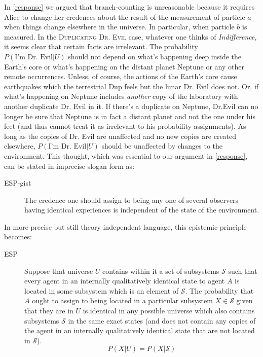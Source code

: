 \documentclass[onecolumn,secnumarabic,amsmath,amssymb,balancelastpage,nofootinbib]{article}
\begin{document}
In \textsection \ref{response} we argued that branch-counting is unreasonable because it requires Alice to change her credences about the result of the measurement of particle $a$ when things change elsewhere in the universe. In particular, when particle $b$ is measured.  In the \textsc{Duplicating Dr. Evil} case, whatever one thinks of \emph{Indifference}, it seems clear that certain facts are irrelevant. The probability $P(\text{I'm Dr. Evil}|U)$ should not depend on what's happening deep inside the Earth's core or what's happening on the distant planet Neptune or any other remote occurrences.  Unless, of course, the actions of the Earth's core cause earthquakes which the terrestrial Dup feels but the lunar Dr. Evil does not.  Or, if what's happening on Neptune includes \emph{another} copy of the laboratory with another duplicate Dr. Evil in it.  If there's a duplicate on Neptune, Dr.Evil can no longer be sure that Neptune is in fact a distant planet and not the one under his feet (and thus cannot treat it as irrelevant to his probability assignments).  As long as the copies of Dr. Evil are unaffected and no new copies are created elsewhere, $P(\text{I'm Dr. Evil}|U)$ should be unaffected by changes to the environment.  This thought, which was essential to our argument in \textsection \ref{response}, can be stated in imprecise slogan form as:
\begin{description}
\item[ESP-gist]  The credence one should assign to being any one of several observers having identical experiences is independent of the state of the environment.
\end{description}
In more precise but still theory-independent language, this epistemic principle becomes:
\begin{description}
\item[ESP]  Suppose that universe $U$ contains within it a set of subsystems $\mathcal{S}$ such that every agent in an internally qualitatively identical state to agent $A$ is located in some subsystem which is an element of $\mathcal{S}$.  The probability that $A$ ought to assign to being located in a particular subsystem $X\in\mathcal{S}$ given that they are in $U$ is identical in any possible universe which also contains subsystems $\mathcal{S}$ in the same exact states (and does not contain any copies of the agent in an internally qualitatively identical state that are not located in $\mathcal{S}$).
\begin{equation}
P(X|U)=P(X|\mathcal{S})
\label{esp}
\end{equation}
\end{description}
\end{document}
